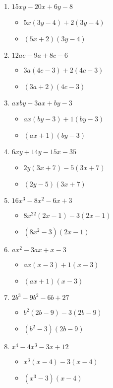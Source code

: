 \begin{enumerate}
\item $15xy - 20x + 6y - 8$
  \begin{itemize}
  \item $5x(3y-4)+2(3y-4)$
  \item $(5x+2)(3y-4)$
  \end{itemize}
\item $12ac - 9a + 8c - 6$
  \begin{itemize}
  \item $3a(4c-3)+2(4c-3)$
  \item $(3a+2)(4c-3)$
  \end{itemize}
\item $axby - 3ax + by - 3$
  \begin{itemize}
  \item $ax(by-3)+1(by-3)$
  \item $(ax+1)(by-3)$
  \end{itemize}
\item $6xy + 14y - 15x - 35$
  \begin{itemize}
  \item $2y(3x+7)-5(3x+7)$
  \item $(2y-5)(3x+7)$
  \end{itemize}
\item $16x^{3} - 8x^{2} - 6x + 3$
  \begin{itemize}
  \item $8x^{22}(2x-1)-3(2x-1)$
  \item $(8x^{2}-3)(2x-1)$
  \end{itemize}
\item $ax^{2} - 3ax + x - 3$
  \begin{itemize}
  \item $ax(x-3)+1(x-3)$
  \item $(ax+1)(x-3)$
  \end{itemize}
\item $2b^{3} - 9b^{2} - 6b + 27$
  \begin{itemize}
  \item $b^{2}(2b-9)-3(2b-9)$
  \item $(b^{2}-3)(2b-9)$
  \end{itemize}
\item $x^{4} - 4x^{3} - 3x + 12$
  \begin{itemize}
  \item $x^{3}(x-4)-3(x-4)$
  \item $(x^{3}-3)(x-4)$
  \end{itemize}

\end{enumerate}
